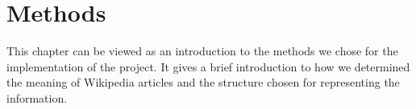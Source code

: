 \chapter{Methods}
This chapter can be viewed as an introduction to the methods we chose for the implementation of the project. It gives a brief introduction to how we determined the meaning of Wikipedia articles and the structure chosen for representing the information.






